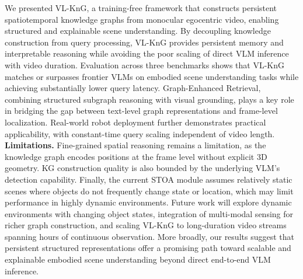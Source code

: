 We presented VL-KnG, a training-free framework that constructs persistent spatiotemporal knowledge graphs from monocular egocentric video, enabling structured and explainable scene understanding.
By decoupling knowledge construction from query processing, VL-KnG provides persistent memory and interpretable reasoning while avoiding the poor scaling of direct VLM inference with video duration.
Evaluation across three benchmarks shows that VL-KnG matches or surpasses frontier VLMs on embodied scene understanding tasks while achieving substantially lower query latency.
Graph-Enhanced Retrieval, combining structured subgraph reasoning with visual grounding, plays a key role in bridging the gap between text-level graph representations and frame-level localization.
Real-world robot deployment further demonstrates practical applicability, with constant-time query scaling independent of video length.
\textbf{Limitations.} Fine-grained spatial reasoning remains a limitation, as the knowledge graph encodes positions at the frame level without explicit 3D geometry. 
KG construction quality is also bounded by the underlying VLM's detection capability. 
Finally, the current STOA module assumes relatively static scenes where objects do not frequently change state or location, which may limit performance in highly dynamic environments.
Future work will explore dynamic environments with changing object states, integration of multi-modal sensing for richer graph construction, and scaling VL-KnG to long-duration video streams spanning hours of continuous observation. 
More broadly, our results suggest that persistent structured representations offer a promising path toward scalable and explainable embodied scene understanding beyond direct end-to-end VLM inference.